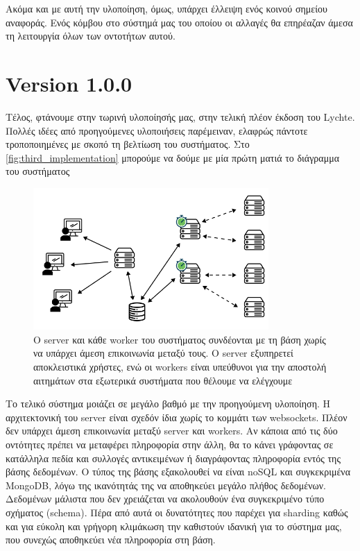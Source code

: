 Ακόμα και με αυτή την υλοποίηση, όμως, υπάρχει έλλειψη ενός κοινού σημείου αναφοράς. Ενός κόμβου στο σύστημά μας του οποίου
οι αλλαγές θα επηρέαζαν άμεσα τη λειτουργία όλων των οντοτήτων αυτού.

\section{Version 1.0.0}
\label{section:third_implementation}

Τέλος, φτάνουμε στην τωρινή υλοποίησής μας, στην τελική πλέον έκδοση του Lychte. Πολλές ιδέες από προηγούμενες υλοποιήσεις
παρέμειναν, ελαφρώς πάντοτε τροποποιημένες με σκοπό τη βελτίωση του συστήματος. Στο \autoref{fig:third_implementation} μπορούμε να δούμε με μία πρώτη ματιά
το διάγραμμα του συστήματος

\begin{figure}[!ht]
	\centering
	\includegraphics[width=0.8\textwidth]{./images/chapter4/lychte-third-implementation.png}
	\caption[Διάγραμμα Τελικής Υλοποίησης]{Ο server και κάθε worker του συστήματος συνδέονται με τη βάση χωρίς να υπάρχει άμεση επικοινωνία μεταξύ τους. Ο server εξυπηρετεί αποκλειστικά χρήστες, ενώ οι workers είναι υπεύθυνοι για την αποστολή αιτημάτων στα εξωτερικά συστήματα που θέλουμε να ελέγχουμε}
	\label{fig:third_implementation}
\end{figure}

Το τελικό σύστημα μοιάζει σε μεγάλο βαθμό με την προηγούμενη υλοποίηση. Η αρχιτεκτονική του server είναι σχεδόν ίδια χωρίς το κομμάτι των websockets.
Πλέον δεν υπάρχει άμεση επικοινωνία μεταξύ server και workers. Αν κάποια από τις δύο οντότητες πρέπει να μεταφέρει
πληροφορία στην άλλη, θα το κάνει γράφοντας σε κατάλληλα πεδία και συλλογές αντικειμένων ή διαγράφοντας πληροφορία εντός της βάσης δεδομένων.
Ο τύπος της βάσης εξακολουθεί να είναι noSQL και συγκεκριμένα MongoDB, λόγω της ικανότητάς της να αποθηκεύει μεγάλο πλήθος δεδομένων. Δεδομένων μάλιστα που δεν χρειάζεται
να ακολουθούν ένα συγκεκριμένο τύπο σχήματος (schema). Πέρα από αυτά οι δυνατότητες που παρέχει για sharding καθώς και για
εύκολη και γρήγορη κλιμάκωση την καθιστούν ιδανική για το σύστημα μας, που συνεχώς αποθηκεύει νέα πληροφορία στη βάση.

